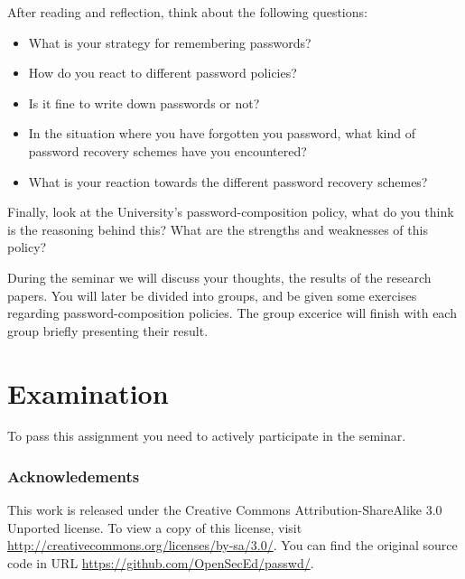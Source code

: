After reading and reflection, think about the following questions:

\begin{itemize}
  \item What is your strategy for remembering passwords?
  \item How do you react to different password policies?
  \item Is it fine to write down passwords or not?
  \item In the situation where you have forgotten you password,
  	what kind of password recovery schemes have you encountered?
  \item What is your reaction towards the different password recovery schemes? 
\end{itemize}

Finally, look at the University's password-composition policy, what do you 
think is the reasoning behind this? What are the strengths and weaknesses of this policy?

During the seminar we will discuss your thoughts, the results of the research 
papers. You will later be divided into groups, and be given some exercises
regarding password-composition policies. The group excerice will finish with each group
briefly presenting their result.

\section{Examination}
\label{sec:exam}
To pass this assignment you need to actively participate in the seminar.

\subsubsection*{Acknowledements}

This work is released under the Creative Commons Attribution-ShareAlike 3.0 
Unported license.
To view a copy of this license, visit 
\url{http://creativecommons.org/licenses/by-sa/3.0/}.
You can find the original source code in URL 
\url{https://github.com/OpenSecEd/passwd/}.

\printbibliography{}
